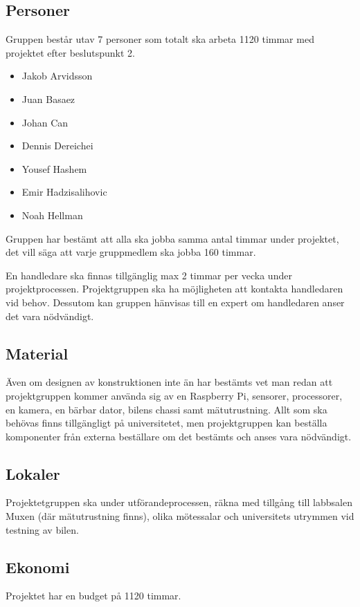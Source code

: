 \documentclass[projektplan/plan.tex]{subfiles}
\begin{document}
\subsection{Personer}
Gruppen består utav 7 personer som totalt ska arbeta 1120 timmar med projektet
efter beslutspunkt 2.

\begin{itemize}
    \item Jakob Arvidsson
    \item Juan Basaez
    \item Johan Can
    \item Dennis Dereichei
    \item Yousef Hashem
    \item Emir Hadzisalihovic
    \item Noah Hellman

\end{itemize}
Gruppen har bestämt att alla ska jobba samma antal timmar under projektet, det
vill säga att varje gruppmedlem ska jobba 160 timmar.

En handledare ska finnas tillgänglig max 2 timmar per vecka under
projektprocessen. Projektgruppen ska ha möjligheten att kontakta handledaren
vid behov. Dessutom kan gruppen hänvisas till en expert om handledaren anser
det vara nödvändigt.

\subsection{Material}
Även om designen av konstruktionen inte än har bestämts vet man redan att
projektgruppen kommer använda sig av en Raspberry Pi, sensorer, processorer, en
kamera, en bärbar dator, bilens chassi samt mätutrustning. Allt som ska
behövas finns tillgängligt på universitetet, men projektgruppen kan beställa
komponenter från externa beställare om det bestämts och anses vara nödvändigt.

\subsection{Lokaler}
Projektetgruppen ska under utförandeprocessen, räkna med tillgång till
labbsalen Muxen (där mätutrustning finns), olika mötessalar och universitets
utrymmen vid testning av bilen.

\subsection{Ekonomi}
Projektet har en budget på 1120 timmar.
\end{document}
